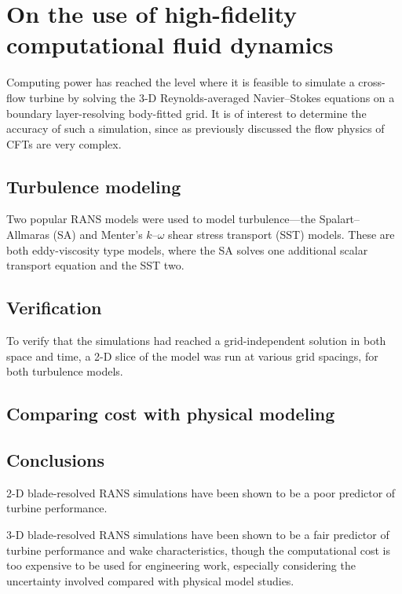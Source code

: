 \chapter{On the use of high-fidelity computational fluid dynamics}

Computing power has reached the level where it is feasible to simulate a
cross-flow turbine by solving the 3-D Reynolds-averaged Navier--Stokes equations
on a boundary layer-resolving body-fitted grid. It is of interest to determine
the accuracy of such a simulation, since as previously discussed the flow
physics of CFTs are very complex.


\section{Turbulence modeling}

Two popular RANS models were used to model turbulence---the Spalart--Allmaras
(SA) and Menter's $k$--$\omega$ shear stress transport (SST) models. These are
both eddy-viscosity type models, where the SA solves one additional scalar
transport equation and the SST two.


\section{Verification}

To verify that the simulations had reached a grid-independent solution in both
space and time, a 2-D slice of the model was run at various grid spacings, for
both turbulence models.


\section{Comparing cost with physical modeling}


\section{Conclusions}

2-D blade-resolved RANS simulations have been shown to be a poor predictor of
turbine performance.

3-D blade-resolved RANS simulations have been shown to be a fair predictor of
turbine performance and wake characteristics, though the computational cost is
too expensive to be used for engineering work, especially considering the
uncertainty involved compared with physical model studies.